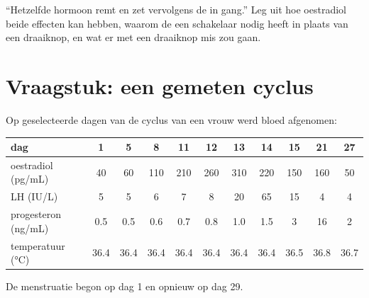 \begin{exercise}[$\star\star\star$]\label{exo:b2:reproductive-hormones:12}
``Hetzelfde hormoon remt en zet vervolgens de  in gang.'' Leg uit
hoe oestradiol beide effecten kan hebben, waarom de  een
schakelaar nodig heeft in plaats van een draaiknop, en wat er met een
draaiknop mis zou gaan.
\end{exercise}

\section{Vraagstuk: een gemeten cyclus}

\begin{problem}
\label{pb:b2:reproductive-hormones:1}
Op geselecteerde dagen van de cyclus van een vrouw werd bloed afgenomen:

\begin{center}
\small
\begin{tabular}{lcccccccccc}
\hline
dag & 1 & 5 & 8 & 11 & 12 & 13 & 14 & 15 & 21 & 27 \\
\hline
oestradiol (\unit{pg/mL}) & 40 & 60 & 110 & 210 & 260 & 310 & 220 & 150 & 160 & 50 \\
LH (\unit{IU/L}) & 5 & 5 & 6 & 7 & 8 & 20 & 65 & 15 & 4 & 4 \\
progesteron (\unit{ng/mL}) & 0.5 & 0.5 & 0.6 & 0.7 & 0.8 & 1.0 & 1.5 & 3 & 16 & 2 \\
temperatuur (\unit{\celsius}) & 36.4 & 36.4 & 36.4 & 36.4 & 36.4 & 36.4 & 36.4 & 36.5 & 36.8 & 36.7 \\
\hline
\end{tabular}
\end{center}

De menstruatie begon op dag 1 en opnieuw op dag 29.


\end{problem}
